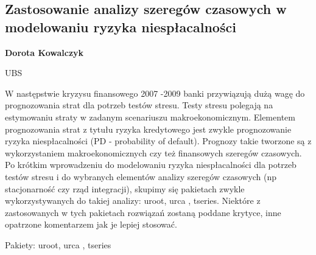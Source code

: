 \documentclass[\main/boa.tex]{subfiles}
\begin{document}
\subsection{Zastosowanie analizy szeregów czasowych w modelowaniu ryzyka niespłacalności}

\begin{minipage}{0.915\textwidth}
	\centering
  {\bf {} Dorota Kowalczyk}
\end{minipage}


\begin{affiliations}
\begin{minipage}{0.915\textwidth}
\centering
UBS \\[-2pt]
\end{minipage}
\end{affiliations}

\vskip 0.3cm

 W następstwie kryzysu finansowego 2007 -2009 banki przywiązują dużą wagę do prognozowania strat dla potrzeb testów stresu. Testy stresu polegają na estymowaniu straty w zadanym scenariuszu makroekonomicznym. Elementem prognozowania strat z tytułu ryzyka kredytowego jest zwykle prognozowanie ryzyka niespłacalności (PD - probability of default). Prognozy takie tworzone są z wykorzystaniem makroekonomicznych czy też finansowych szeregów czasowych. Po krótkim wprowadzeniu do modelowaniu ryzyka niespłacalności dla potrzeb testów stresu i do wybranych elementów analizy szeregów czasowych (np stacjonarność czy rząd integracji), skupimy się pakietach zwykle wykorzystywanych do takiej analizy: uroot, urca , tseries. Niektóre z zastosowanych w tych pakietach rozwiązań zostaną poddane krytyce, inne opatrzone komentarzem jak je lepiej stosować.

Pakiety: uroot, urca , tseries
\end{document}
